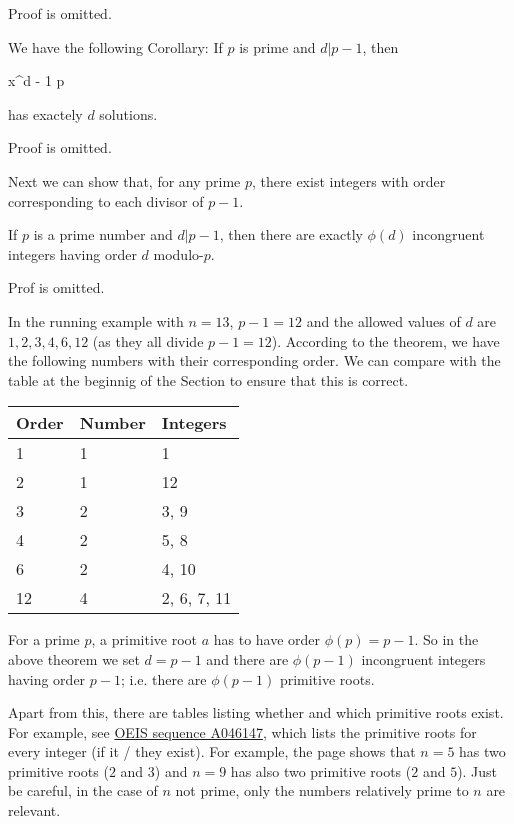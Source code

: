 Proof is omitted.

We have the following Corollary: If $p$ is prime and $d | p-1$, then

\bee
x^d - 1  \mod p
\eee

has exactely $d$ solutions.

Proof is omitted.

Next we can show that, for any prime $p$, there exist integers with order corresponding to each divisor of $p-1$.

\begin{theorem}
  If $p$ is a prime number and $d | p-1$, then there are exactly $\phi(d)$ incongruent integers having order $d$ modulo-$p$.
\end{theorem}

Prof is omitted.

In the running example with $n=13$, $p-1 = 12$ and the allowed values of $d$ are $1,2,3,4,6, 12$ (as they all divide $p-1=12$). According to the theorem, we have the following numbers with their corresponding order. We can compare with the table %
at the beginnig of the Section to ensure that this is correct.

\vspace*{2mm}

\begin{tabular}{lll}
  Order & Number & Integers \\ \hline
  1     & 1      & 1        \\
  2     & 1      & 12       \\
  3     & 2      & 3, 9     \\
  4     & 2      & 5, 8     \\
  6     & 2      & 4, 10    \\
  12    & 4      & 2, 6, 7, 11
\end{tabular}

\vspace*{2mm}

For a prime $p$, a primitive root $a$ has to have order $\phi(p) = p-1$. So in the above theorem we set $d=p-1$ and there are $\phi(p-1)$ incongruent integers having order $p-1$; i.e. there are $\phi(p-1)$ primitive roots.


Apart from this, there are tables listing whether and which primitive roots exist. For example, see \href{http://oeis.org/A046147}{OEIS sequence A046147}, which lists the primitive roots for every integer (if it / they exist). For example, the page shows that $n=5$ has two primitive roots ($2$ and $3$) and $n=9$ has also two primitive roots ($2$ and $5$). Just be careful, in the case of $n$ not prime, only the numbers relatively prime to $n$ are relevant.

